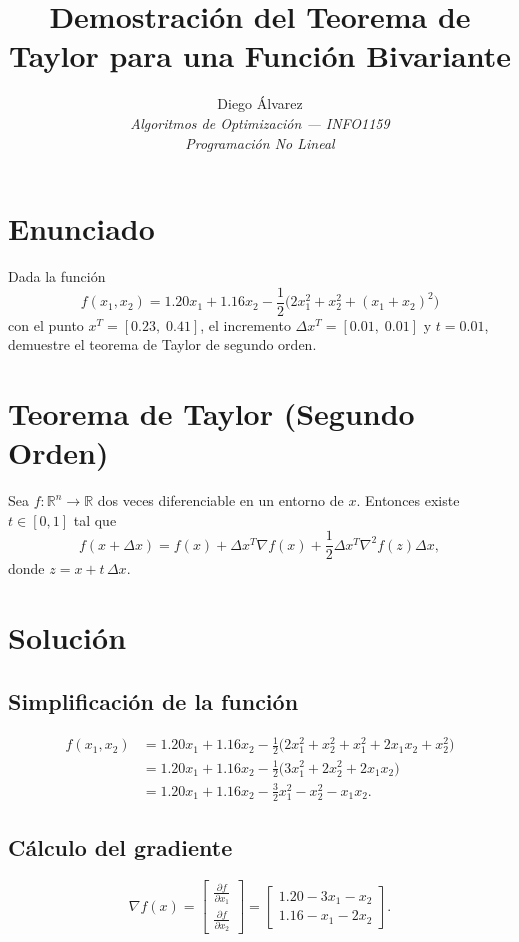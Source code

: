 \documentclass[12pt]{article}
\title{Demostración del Teorema de Taylor para una Función Bivariante}
\author{Diego Álvarez \\[4pt]
  \small \textit{Algoritmos de Optimización — INFO1159} \\[2pt]
  \small \textit{Programación No Lineal}}
\date{}
\begin{document}
\maketitle

\section{Enunciado}

Dada la función
\[
f(x_1, x_2) = 1.20x_1 + 1.16x_2 - \frac{1}{2}\bigl(2x_1^2 + x_2^2 + (x_1 + x_2)^2\bigr)
\]
con el punto \(x^T = [0.23,\; 0.41]\), el incremento \(\Delta x^T = [0.01,\; 0.01]\) y
\(t = 0.01\), demuestre el teorema de Taylor de segundo orden.

\section{Teorema de Taylor (Segundo Orden)}

Sea \(f : \mathbb{R}^n \to \mathbb{R}\) dos veces diferenciable en un entorno de \(x\).
Entonces existe \(t \in [0, 1]\) tal que
\[
f(x + \Delta x) = f(x) + \Delta x^T \nabla f(x) + \frac{1}{2} \Delta x^T \nabla^2 f(z) \Delta x,
\]
donde \(z = x + t\,\Delta x\).

\section{Solución}

\subsection{Simplificación de la función}

\begin{align*}
f(x_1, x_2)
&= 1.20x_1 + 1.16x_2 - \frac{1}{2}\bigl(2x_1^2 + x_2^2 + x_1^2 + 2x_1x_2 + x_2^2\bigr) \\
&= 1.20x_1 + 1.16x_2 - \frac{1}{2}\bigl(3x_1^2 + 2x_2^2 + 2x_1x_2\bigr) \\
&= 1.20x_1 + 1.16x_2 - \frac{3}{2}x_1^2 - x_2^2 - x_1x_2.
\end{align*}

\subsection{Cálculo del gradiente}

\[
\nabla f(x) =
\begin{bmatrix}
\frac{\partial f}{\partial x_1} \\[4pt]
\frac{\partial f}{\partial x_2}
\end{bmatrix}
=
\begin{bmatrix}
1.20 - 3x_1 - x_2 \\
1.16 - x_1 - 2x_2
\end{bmatrix}.
\]
\end{document}

